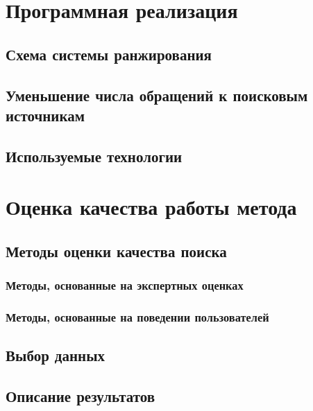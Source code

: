 \documentclass[12pt,a4paper]{report}
\begin{document}

\chapter{Программная реализация}

\section{Схема системы ранжирования}
\section{Уменьшение числа обращений к поисковым источникам}
\section{Используемые технологии}

\chapter{Оценка качества работы метода}

\section{Методы оценки качества поиска}
\subsection{Методы, основанные на экспертных оценках}
\subsection{Методы, основанные на поведении пользователей}

\section{Выбор данных}
\section{Описание результатов}
\end{document}
